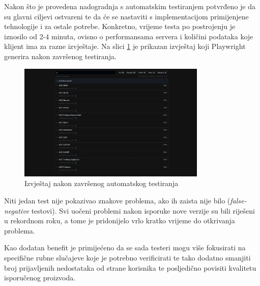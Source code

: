 Nakon što je provedena nadogradnja s automatskim testiranjem potvrđeno je da su glavni ciljevi ostvareni te da će se nastaviti s implementacijom primijenjene tehnologije i za ostale potrebe.
Konkretno, vrijeme testa po postrojenju je iznosilo od 2-4 minuta, ovisno o performansama servera i količini podataka koje klijent ima za razne izvještaje.
Na slici \ref{img:fullTestPass} je prikazan izvještaj koji Playwright generira nakon završenog testiranja.
\begin{figure}[!h]\begin{center}
    \includegraphics[width=0.8\textwidth]{"img/fullTestPass"}
    \caption{Izvještaj nakon završenog automatskog testiranja}\label{img:fullTestPass}
\end{center}\end{figure}
 
Niti jedan test nije pokazivao znakove problema, ako ih zaista nije bilo (\emph{false-negative} testovi).
Svi uočeni problemi nakon isporuke nove verzije su bili riješeni u rekordnom roku, a tome je pridonijelo vrlo kratko vrijeme do otkrivanja problema.

Kao dodatan benefit je primijećeno da se sada testeri mogu više fokusirati na specifične rubne slučajeve koje je potrebno verificirati te tako dodatno smanjiti broj prijavljenih nedostataka od strane korisnika te posljedično povisiti kvalitetu isporučenog proizvoda.
